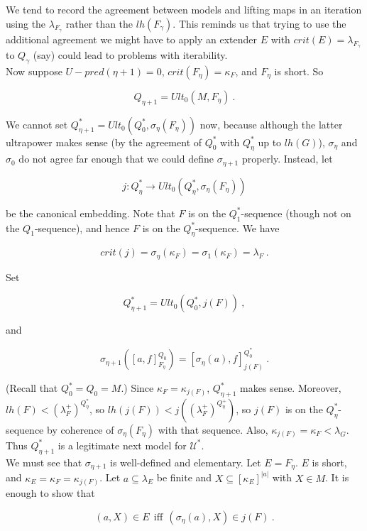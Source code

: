 \documentclass[12pt]{article}
\begin{document}
We tend to record the agreement between models and lifting maps in an iteration using the $\lambda_{F_\gamma }$ rather than the $lh ( F_\gamma )$.  This reminds us that trying to use the additional agreement we might have to apply an extender $E$ with $crit (E) = \lambda_{F_\gamma }$ to $Q_\gamma$ (say) could lead to problems with iterability.\\

Now suppose $U-pred (\eta + 1 ) = 0$, $crit ( F_\eta) = \kappa_F $, and $F_\eta$ is short.  So

\[
Q_{\eta + 1} = Ult_0 (M , F_\eta ) \ .
\]

We cannot set $Q_{\eta + 1 }^* = Ult_0 ( Q_0^* , \sigma_\eta (F_\eta ))$ now, because although the latter ultrapower makes sense (by the agreement of $Q_0^*$ with $Q_\eta^*$ up to $lh (G)$), $\sigma_\eta$ and $\sigma_0$ do not agree far enough that we could define $\sigma_{\eta + 1}$ properly.  Instead, let

\[
j : Q_\eta^* \longrightarrow Ult_0 ( Q_\eta^* , \sigma_\eta (F_\eta ))
\]

be the canonical embedding.  Note that $F$ is on the $Q_1^*$-sequence (though not on the $Q_1$-sequence), and hence $F$ is on the $Q_\eta^*$-sequence.  We have

\[
crit(j) = \sigma_\eta (\kappa_F ) = \sigma_1 (\kappa_F) = \lambda_F \ .
\]

Set

\[
Q_{\eta + 1}^* = Ult_0 (Q_0^* , j (F)) \ ,
\]

and

\[
\sigma_{\eta + 1} ( [ a, f ]_{F_\eta }^{Q_0} ) = [ \sigma_\eta (a) , f ]_{j (F)}^{Q_0^*} \ .
\]

(Recall that $Q_0^* = Q_0 = M$.)  Since $\kappa_F = \kappa_{j(F)}$, $Q_{\eta + 1}^*$ makes sense.  Moreover, $lh(F) < (\lambda_F^+ )^{Q_\eta^*}$, so $lh (j (F)) < j ( (\lambda_F^+)^{Q_\eta^+})$, so $j(F)$ is on the $Q_\eta^*$-sequence by coherence of $\sigma_\eta (F_\eta )$ with that sequence.  Also, $\kappa_{j (F)} = \kappa_F < \lambda_G$.  Thus $Q_{\eta + 1}^*$ is a legitimate next model for $\mathscr{U}^*$.\\

We must see that $\sigma_{\eta + 1}$ is well-defined and elementary.  Let $E = F_\eta$.  $E$ is short, and $\kappa_E = \kappa_F = \kappa_{j(F)}$.  Let $a \subseteq \lambda_E$ be finite and $X \subseteq [ \kappa_E ]^{|a|}$ with $X \in M$.  It is enough to show that

\[
(a, X) \in E \ \ \text{iff} \ \ (\sigma_\eta (a), X ) \in j(F) \ .
\]
\end{document}
